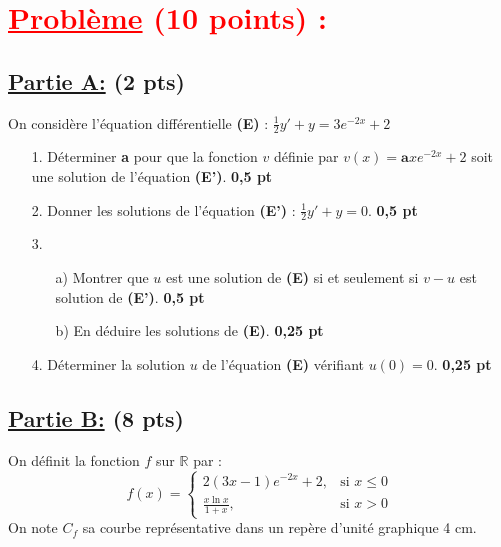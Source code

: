 \documentclass[12pt]{article}
\begin{document}
\section*{\textcolor{red}{\underline{Problème} (10 points) :}}
\subsection*{\underline{Partie A:} (2 pts)}
On considère l'équation différentielle \textbf{(E)} : $\frac{1}{2}y' + y = 3e^{-2x} + 2$

\begin{itemize}
    \item[1.] Déterminer \textbf{a} pour que la fonction $v$ définie par $v(x) = \textbf{a}xe^{-2x} + 2$ soit une solution de l'équation \textbf{(E')}. \textbf{0,5 pt}
    \item[2.] Donner les solutions de l'équation \textbf{(E')} : $\frac{1}{2}y' + y = 0$. \textbf{0,5 pt}
    \item[3.] 
    \begin{itemize}
        \item[a)] Montrer que $u$ est une solution de \textbf{(E)} si et seulement si $v - u$ est solution de \textbf{(E')}. \textbf{0,5 pt}
        \item[b)] En déduire les solutions de \textbf{(E)}. \textbf{0,25 pt}
    \end{itemize}
    \item[4.] Déterminer la solution $u$ de l'équation \textbf{(E)} vérifiant $u(0) = 0$. \textbf{0,25 pt}
\end{itemize}
\subsection*{\underline{Partie B:} (8 pts)}
On définit la fonction $f$ sur $\mathbb{R}$ par :
\[
f(x) = \begin{cases} 
  2(3x - 1)e^{-2x} + 2, & \text{si } x \leq 0 \\
  \frac{x\ln x}{1 + x}, & \text{si } x > 0 
\end{cases}
\]
On note $C_{f}$ sa courbe représentative dans un repère d'unité graphique 4 cm.
\end{document}
